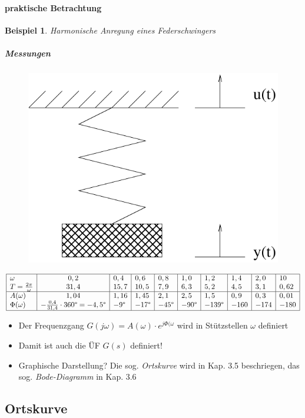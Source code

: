\documentclass[12pt,a4paper,ngerman]{scrartcl}
\newtheorem{bsp}{Beispiel}[section] %
\begin{document}
\paragraph{praktische Betrachtung}
\begin{bsp}Harmonische Anregung eines Federschwingers
\end{bsp}
\subparagraph{Messungen}
\begin{figure}[H]
  \centering
  \includegraphics[width=0.4\linewidth]{sysregel_bsp_3-4}
\end{figure}
\begin{align*}
  \begin{array}{|l|c|l|l|l|l|l|l|l|l|}
    \hline
    \omega               &0,2 &0,4 &0,6 &0,8&1,0&1,2&1,4&2,0&10    \\
    T=\frac{2\pi}{\omega}&31,4&15,7&10,5&7,9&6,3&5,2&4,5&3,1&0,62  \\
    \hline
    A(\omega)            &1,04&1,16&1,45&2,1&2,5&1,5&0,9&0,3&0,01  \\
    \Phi(\omega)         &-\frac{0,4}{31,4}\cdot 360\degree =-4,5\degree&-9\degree&-17\degree&-45\degree&-90\degree&-139\degree&-160&-174&-180\\
\hline
  \end{array}
\end{align*}
\begin{itemize}
\item Der Frequenzgang $G(j\omega)=A(\omega)\cdot e^{j\Phi(\omega}$ wird in Stützstellen $\omega$ definiert
\item Damit ist auch die ÜF $G(s)$ definiert!
\item Graphische Darstellung? Die sog. \emph{Ortskurve} wird in Kap. 3.5 beschriegen, das sog. \emph{Bode-Diagramm} in Kap. 3.6
\end{itemize}

\subsection{Ortskurve}
\end{document}

